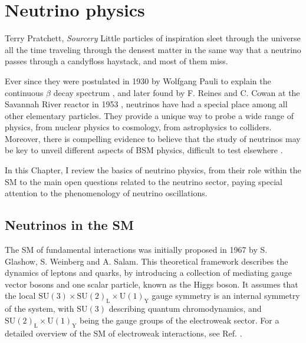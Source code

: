 \chapter{Neutrino physics}\label{chapter:neutrinos}

\begin{chapquote}{Terry Pratchett, \textit{Sourcery}}
	Little particles of inspiration sleet through the universe all the time traveling through the densest matter in the same way that a neutrino passes through a candyfloss haystack, and most of them miss.
\end{chapquote}

Ever since they were postulated in 1930 by Wolfgang Pauli to explain the continuous $\beta$ decay spectrum \cite{Pauli1930}, and later found by F. Reines and C. Cowan at the Savannah River reactor in 1953 \cite{Reines1953}, neutrinos have had a special place among all other elementary particles. They provide a unique way to probe a wide range of physics, from nuclear physics to cosmology, from astrophysics to colliders. Moreover, there is compelling evidence to believe that the study of neutrinos may be key to unveil different aspects of BSM physics, difficult to test elsewhere \cite{Arguelles2019}.

In this Chapter, I review the basics of neutrino physics, from their role within the SM to the main open questions related to the neutrino sector, paying special attention to the phenomenology of neutrino oscillations.

\section{Neutrinos in the SM}\label{sec:sm_and_nu}

The SM of fundamental interactions was initially proposed in 1967 by S. Glashow, S. Weinberg and A. Salam\cite{Glashow1961,Weinberg1967,Salam1968}. This theoretical framework describes the dynamics of leptons and quarks, by introducing a collection of mediating gauge vector bosons and one scalar particle, known as the Higgs boson. It assumes that the local $\mathrm{SU}(3)\times\mathrm{SU}(2)_{\mathrm{L}}\times\mathrm{U}(1)_{\mathrm{Y}}$ gauge symmetry is an internal symmetry of the system, with $\mathrm{SU}(3)$ describing quantum chromodynamics, and $\mathrm{SU}(2)_{\mathrm{L}}\times\mathrm{U}(1)_{\mathrm{Y}}$ being the gauge groups of the electroweak sector. For a detailed overview of the SM of electroweak interactions, see Ref. \cite{Pich2012}.

